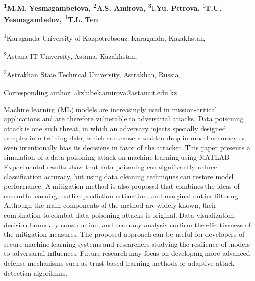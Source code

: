 
\begin{articleheader}

{\bfseries
\textsuperscript{1}M.M. Yesmagambetova,
\textsuperscript{2}A.S. Amirova\textsuperscript{\envelope },
\textsuperscript{3}I.Yu. Petrova,
\textsuperscript{1}T.U. Yesmagambetov,
\textsuperscript{1}T.L. Ten
}
\end{articleheader}

\begin{affiliation}
\textsuperscript{1}Karaganda University of Kazpotrebsouz, Karaganda, Kazakhstan,

\textsuperscript{2}Astana IT University, Astana, Kazakhstan,

\textsuperscript{3}Astrakhan State Technical University, Astrakhan, Russia,

\raggedright \textsuperscript{\envelope }Corresponding author: akzhibek.amirova@astanait.edu.kz
\end{affiliation}

Machine learning (ML) models are increasingly used in mission-critical
applications and are therefore vulnerable to adversarial attacks. Data
poisoning attack is one such threat, in which an adversary injects
specially designed samples into training data, which can cause a sudden
drop in model accuracy or even intentionally bias its decisions in favor
of the attacker. This paper presents a simulation of a data poisoning
attack on machine learning using MATLAB. Experimental results show that
data poisoning can significantly reduce classification accuracy, but
using data cleaning techniques can restore model performance. A
miti\-gation method is also proposed that combines the ideas of ensemble
learning, outlier prediction estimation, and marginal outlier filtering.
Although the main components of the method are widely known, their
combination to combat data poisoning attacks is original. Data
visualization, decision boundary construction, and accuracy analysis
confirm the effectiveness of the mitigation measures. The proposed
approach can be useful for developers of secure machine learning systems
and researchers studying the resilience of models to adversarial
influences. Future research may focus on developing more advanced
defense mechanisms such as trust-based learning methods or adaptive
attack detection algorithms.

